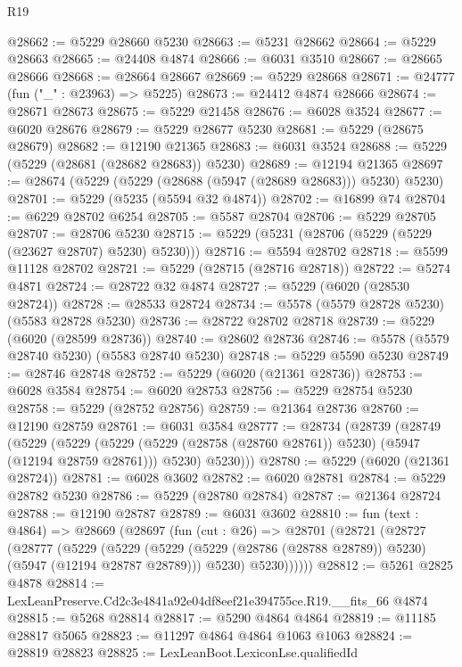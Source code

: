 \begin{lexlean}{R19}
\begin{coremodule}
@28662 := @5229 @28660 @5230
@28663 := @5231 @28662
@28664 := @5229 @28663
@28665 := @24408 @4874
@28666 := @6031 @3510
@28667 := @28665 @28666
@28668 := @28664 @28667
@28669 := @5229 @28668
@28671 := @24777 (fun ("_" : @23963) => @5225)
@28673 := @24412 @4874 @28666
@28674 := @28671 @28673
@28675 := @5229 @21458
@28676 := @6028 @3524
@28677 := @6020 @28676
@28679 := @5229 @28677 @5230
@28681 := @5229 (@28675 @28679)
@28682 := @12190 @21365
@28683 := @6031 @3524
@28688 := @5229 (@5229 (@28681 (@28682 @28683)) @5230)
@28689 := @12194 @21365
@28697 := @28674 (@5229 (@5229 (@28688 (@5947 (@28689 @28683))) @5230) @5230)
@28701 := @5229 (@5235 (@5594 @32 @4874))
@28702 := @16899 @74
@28704 := @6229 @28702 @6254
@28705 := @5587 @28704
@28706 := @5229 @28705
@28707 := @28706 @5230
@28715 := @5229 (@5231 (@28706 (@5229 (@5229 (@23627 @28707) @5230) @5230)))
@28716 := @5594 @28702
@28718 := @5599 @11128 @28702
@28721 := @5229 (@28715 (@28716 @28718))
@28722 := @5274 @4871
@28724 := @28722 @32 @4874
@28727 := @5229 (@6020 (@28530 @28724))
@28728 := @28533 @28724
@28734 := @5578 (@5579 @28728 @5230) (@5583 @28728 @5230)
@28736 := @28722 @28702 @28718
@28739 := @5229 (@6020 (@28599 @28736))
@28740 := @28602 @28736
@28746 := @5578 (@5579 @28740 @5230) (@5583 @28740 @5230)
@28748 := @5229 @5590 @5230
@28749 := @28746 @28748
@28752 := @5229 (@6020 (@21361 @28736))
@28753 := @6028 @3584
@28754 := @6020 @28753
@28756 := @5229 @28754 @5230
@28758 := @5229 (@28752 @28756)
@28759 := @21364 @28736
@28760 := @12190 @28759
@28761 := @6031 @3584
@28777 := @28734
    (@28739
      (@28749
        (@5229
          (@5229
            (@5229 (@5229 (@28758 (@28760 @28761)) @5230) (@5947 (@12194 @28759 @28761)))
            @5230)
          @5230)))
@28780 := @5229 (@6020 (@21361 @28724))
@28781 := @6028 @3602
@28782 := @6020 @28781
@28784 := @5229 @28782 @5230
@28786 := @5229 (@28780 @28784)
@28787 := @21364 @28724
@28788 := @12190 @28787
@28789 := @6031 @3602
@28810 := fun (text : @4864) =>
  @28669
    (@28697
      (fun (cut : @26) =>
      @28701
        (@28721
          (@28727
            (@28777
              (@5229
                (@5229
                  (@5229 (@5229 (@28786 (@28788 @28789)) @5230) (@5947 (@12194 @28787 @28789)))
                  @5230)
                @5230))))))
@28812 := @5261 @2825 @4878
@28814 := LexLeanPreserve.Cd2c3e4841a92e04df8eef21e394755ce.R19.__fits_66 @4874
@28815 := @5268 @28814
@28817 := @5290 @4864 @4864
@28819 := @11185 @28817 @5065
@28823 := @11297 @4864 @4864 @1063 @1063
@28824 := @28819 @28823
@28825 := LexLeanBoot.LexiconLse.qualifiedId

\end{coremodule}
\end{lexlean}
